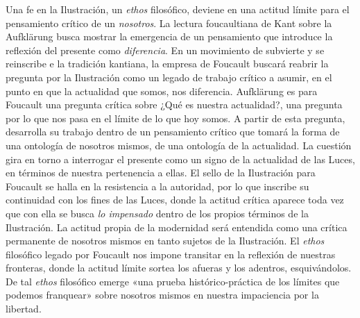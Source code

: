 Una fe en la Ilustración, un \emph{ethos} filosófico, deviene en una actitud límite para el pensamiento crítico de un \emph{nosotros}. La lectura foucaultiana de Kant sobre la Aufklärung busca mostrar la emergencia de un pensamiento que introduce la reflexión del presente como \emph{diferencia}. En un movimiento de subvierte y se reinscribe e la tradición kantiana, la empresa de Foucault buscará reabrir la pregunta por la Ilustración como un legado de trabajo crítico a asumir, en el punto en que la actualidad que somos, nos diferencia. Aufklärung es para Foucault una pregunta crítica sobre ¿Qué es nuestra actualidad?, una pregunta por lo que nos pasa en el límite de lo que hoy somos. A partir de esta pregunta, desarrolla su trabajo dentro de un pensamiento crítico que tomará la forma de una ontología de nosotros mismos, de una ontología de la actualidad. La cuestión gira en torno a interrogar el presente como un signo de la actualidad de las Luces, en términos de nuestra pertenencia a ellas. El sello de la Ilustración para Foucault se halla en la resistencia a la autoridad, por lo que inscribe su continuidad con los fines de las Luces, donde la actitud crítica aparece toda vez que con ella se busca \emph{lo impensado} dentro de los propios términos de la Ilustración. La actitud propia de la modernidad será entendida como una crítica permanente de nosotros mismos en tanto sujetos de la Ilustración. El \emph{ethos} filosófico legado por Foucault nos impone transitar en la reflexión de nuestras fronteras, donde la actitud límite sortea los afueras y los adentros, esquivándolos. De tal \emph{ethos} filosófico emerge «una prueba histórico-práctica de los límites que podemos franquear» sobre nosotros mismos en nuestra impaciencia por la libertad.

